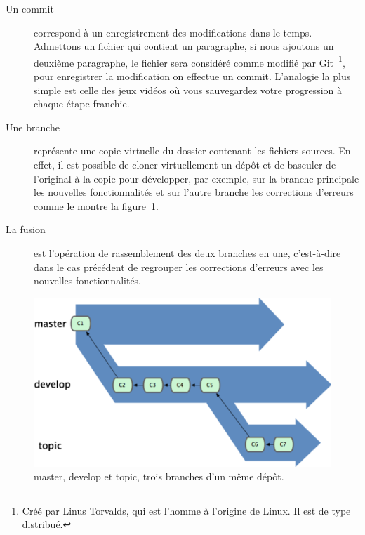     \begin{description}
        \item[Un commit] correspond à un enregistrement des modifications
        dans le temps. Admettons un fichier qui contient un paragraphe, si nous
        ajoutons un deuxième paragraphe, le fichier sera considéré comme modifié
        par Git\, \footnote{Créé par Linus Torvalds, qui est l'homme à l'origine
        de Linux. Il est de type distribué.}, pour enregistrer la modification
        on effectue un commit. L'analogie la plus simple est celle des jeux
        vidéos où vous sauvegardez votre progression à chaque étape franchie.
        \item[Une branche] représente une \og copie virtuelle \fg{} du
        dossier contenant les fichiers sources. En effet, il est possible de
        cloner virtuellement un dépôt et de basculer de l'original à la copie
        pour développer, par exemple, sur la branche principale les nouvelles
        fonctionnalités et sur l'autre branche les corrections d'erreurs comme
        le montre la figure~\ref{branches}.
        \item[La fusion] est l'opération de rassemblement des deux branches en
        une, c'est-à-dire dans le cas précédent de regrouper les corrections
        d'erreurs avec les nouvelles fonctionnalités.
    \end{description}

    \begin{figure}[h]
        \begin{center}
            \includegraphics[scale=1]{images/branches.png}
            \caption{master, develop et topic, trois branches d'un même dépôt.}
            \label{branches}
        \end{center}
    \end{figure}

